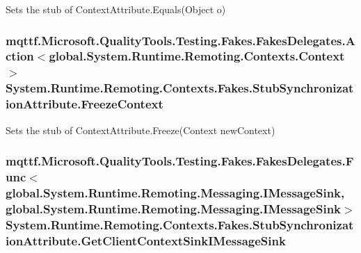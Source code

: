 Sets the stub of Context\-Attribute.\-Equals(\-Object o)

\hypertarget{class_system_1_1_runtime_1_1_remoting_1_1_contexts_1_1_fakes_1_1_stub_synchronization_attribute_aa6c35ec09b411e7feba23f521747959b}{
\subsubsection[{Freeze\-Context}]{\setlength{\rightskip}{0pt plus 5cm}mqttf.\-Microsoft.\-Quality\-Tools.\-Testing.\-Fakes.\-Fakes\-Delegates.\-Action$<$global.\-System.\-Runtime.\-Remoting.\-Contexts.\-Context$>$ System.\-Runtime.\-Remoting.\-Contexts.\-Fakes.\-Stub\-Synchronization\-Attribute.\-Freeze\-Context}}\label{class_system_1_1_runtime_1_1_remoting_1_1_contexts_1_1_fakes_1_1_stub_synchronization_attribute_aa6c35ec09b411e7feba23f521747959b}


Sets the stub of Context\-Attribute.\-Freeze(\-Context new\-Context)

\hypertarget{class_system_1_1_runtime_1_1_remoting_1_1_contexts_1_1_fakes_1_1_stub_synchronization_attribute_a88000724cef8bbcaddaefeee36223629}{
\subsubsection[{Get\-Client\-Context\-Sink\-I\-Message\-Sink}]{\setlength{\rightskip}{0pt plus 5cm}mqttf.\-Microsoft.\-Quality\-Tools.\-Testing.\-Fakes.\-Fakes\-Delegates.\-Func$<$global.\-System.\-Runtime.\-Remoting.\-Messaging.\-I\-Message\-Sink, global.\-System.\-Runtime.\-Remoting.\-Messaging.\-I\-Message\-Sink$>$ System.\-Runtime.\-Remoting.\-Contexts.\-Fakes.\-Stub\-Synchronization\-Attribute.\-Get\-Client\-Context\-Sink\-I\-Message\-Sink}}\label{class_system_1_1_runtime_1_1_remoting_1_1_contexts_1_1_fakes_1_1_stub_synchronization_attribute_a88000724cef8bbcaddaefeee36223629}


